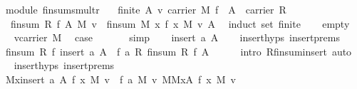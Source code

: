 \begin{isabellebody}
\isamarkuptrue%
\isamarkupfalse%
\ {\isacharparenleft}\ module{\isacharparenright}\ finsum{\isacharunderscore}smult{\isacharunderscore}r{\isacharcolon}\isanewline
\ \ {\isachardoublequoteopen}{\isacharbrackleft}{\isacharbar}\ finite\ A{\isacharsemicolon}\ v{\isasymin}\ carrier\ M{\isacharsemicolon}\ f\ {\isasymin}\ A\ {\isacharminus}{\isachargreater}\ carrier\ R\ {\isacharbar}{\isacharbrackright}\ {\isacharequal}{\isacharequal}{\isachargreater}\isanewline
\ \ \ {\isacharparenleft}finsum\ R\ f\ A\ {\isasymodot}\isactrlbsub M\isactrlesub \ v{\isacharparenright}\ {\isacharequal}\ finsum\ M\ {\isacharparenleft}{\isacharpercent}x{\isachardot}\ f\ x\ {\isasymodot}\isactrlbsub M\isactrlesub \ v{\isacharparenright}\ A\ {\isachardoublequoteclose}\isanewline
%
\isadelimproof
%
\endisadelimproof
%
\isatagproof
{}\isamarkupfalse%
\ {\isacharparenleft}induct\ set{\isacharcolon}\ finite{\isacharparenright}\isanewline
\ \ \isamarkupfalse%
\ empty\ \isanewline
\ \ \isamarkupfalse%
\ {\isacharbackquoteopen}v{\isasymin}carrier\ M{\isacharbackquoteclose}\ \isamarkupfalse%
\ {\isacharquery}case\ \isanewline
\ \ \ \ \isamarkupfalse%
\ simp\isanewline
{}\isamarkupfalse%
\isanewline
\ \ \isamarkupfalse%
\ {\isacharparenleft}insert\ a\ A{\isacharparenright}\isanewline
\ \ \isamarkupfalse%
\ insert{\isachardot}hyps\ insert{\isachardot}prems\ \isamarkupfalse%
\ {}{\isacharcolon}\ {\isachardoublequoteopen}finsum\ R\ f\ {\isacharparenleft}insert\ a\ A{\isacharparenright}\ {\isacharequal}\ f\ a\ {\isasymoplus}\isactrlbsub R\isactrlesub \ finsum\ R\ f\ A{\isachardoublequoteclose}\isanewline
\ \ \ \ \isamarkupfalse%
\ {\isacharparenleft}intro\ R{\isachardot}finsum{\isacharunderscore}insert{\isacharcomma}\ auto{\isacharparenright}\isanewline
\ \ \isamarkupfalse%
\ insert{\isachardot}hyps\ insert{\isachardot}prems\ \isamarkupfalse%
\ {}{\isacharcolon}\ {\isachardoublequoteopen}{\isacharparenleft}{\isasymOplus}\isactrlbsub M\isactrlesub x{\isasymin}insert\ a\ A{\isachardot}\ f\ x\ {\isasymodot}\isactrlbsub M\isactrlesub \ v{\isacharparenright}\ {\isacharequal}\ f\ a\ {\isasymodot}\isactrlbsub M\isactrlesub \ v\ {\isasymoplus}\isactrlbsub M\isactrlesub {\isacharparenleft}{\isasymOplus}\isactrlbsub M\isactrlesub x{\isasymin}A{\isachardot}\ f\ x\ {\isasymodot}\isactrlbsub M\isactrlesub \ v{\isacharparenright}{\isachardoublequoteclose}\ \isanewline

\end{isabellebody}
